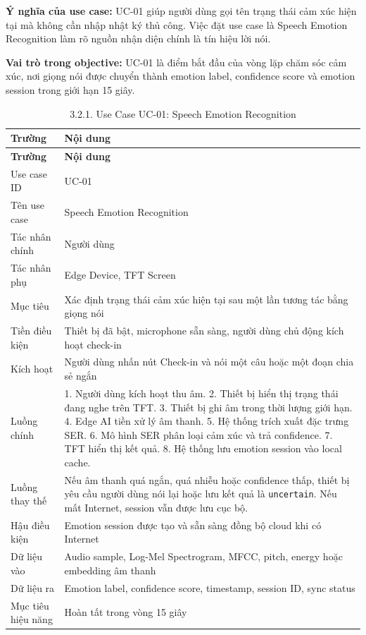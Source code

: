 \documentclass[12pt,a4paper]{article}
\begin{document}
\textbf{Ý nghĩa của use case:} UC-01 giúp người dùng gọi tên trạng thái cảm xúc hiện tại mà không cần nhập nhật ký thủ công. Việc đặt use case là Speech Emotion Recognition làm rõ nguồn nhận diện chính là tín hiệu lời nói.


\textbf{Vai trò trong objective:} UC-01 là điểm bắt đầu của vòng lặp chăm sóc cảm xúc, nơi giọng nói được chuyển thành emotion label, confidence score và emotion session trong giới hạn 15 giây.


\begin{center}
\begin{longtable}{|P{0.30\textwidth}|P{0.62\textwidth}|}
\caption{3.2.1. Use Case UC-01: Speech Emotion Recognition}\\
\hline
\textbf{Trường} & \textbf{Nội dung} \\
\hline
\endfirsthead
\hline
\textbf{Trường} & \textbf{Nội dung} \\
\hline
\endhead
Use case ID & UC-01 \\
\hline
Tên use case & Speech Emotion Recognition \\
\hline
Tác nhân chính & Người dùng \\
\hline
Tác nhân phụ & Edge Device, TFT Screen \\
\hline
Mục tiêu & Xác định trạng thái cảm xúc hiện tại sau một lần tương tác bằng giọng nói \\
\hline
Tiền điều kiện & Thiết bị đã bật, microphone sẵn sàng, người dùng chủ động kích hoạt check-in \\
\hline
Kích hoạt & Người dùng nhấn nút Check-in và nói một câu hoặc một đoạn chia sẻ ngắn \\
\hline
Luồng chính & 1. Người dùng kích hoạt thu âm. 2. Thiết bị hiển thị trạng thái đang nghe trên TFT. 3. Thiết bị ghi âm trong thời lượng giới hạn. 4. Edge AI tiền xử lý âm thanh. 5. Hệ thống trích xuất đặc trưng SER. 6. Mô hình SER phân loại cảm xúc và trả confidence. 7. TFT hiển thị kết quả. 8. Hệ thống lưu emotion session vào local cache. \\
\hline
Luồng thay thế & Nếu âm thanh quá ngắn, quá nhiễu hoặc confidence thấp, thiết bị yêu cầu người dùng nói lại hoặc lưu kết quả là \texttt{uncertain}. Nếu mất Internet, session vẫn được lưu cục bộ. \\
\hline
Hậu điều kiện & Emotion session được tạo và sẵn sàng đồng bộ cloud khi có Internet \\
\hline
Dữ liệu vào & Audio sample, Log-Mel Spectrogram, MFCC, pitch, energy hoặc embedding âm thanh \\
\hline
Dữ liệu ra & Emotion label, confidence score, timestamp, session ID, sync status \\
\hline
Mục tiêu hiệu năng & Hoàn tất trong vòng 15 giây \\
\hline
\end{longtable}
\end{center}
\end{document}
